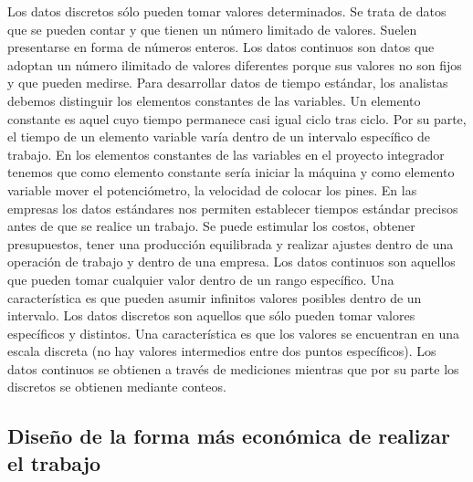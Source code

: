     Los datos discretos sólo pueden tomar valores determinados. Se trata de datos que se pueden contar y que tienen un número limitado de valores. Suelen presentarse en forma de números enteros. Los datos continuos son datos que adoptan un número ilimitado de valores diferentes porque sus valores no son fijos y que pueden medirse. 
    Para desarrollar datos de tiempo estándar, los analistas debemos distinguir los elementos constantes de las variables. Un elemento constante es aquel cuyo tiempo permanece casi igual ciclo tras ciclo. Por su parte, el tiempo de un elemento variable varía dentro de un intervalo específico de trabajo.
    En los elementos constantes de las variables en el proyecto integrador tenemos que como elemento constante sería iniciar la máquina y como elemento variable mover el potenciómetro, la velocidad de colocar los pines.
    En las empresas los datos estándares nos permiten establecer tiempos estándar precisos antes de que se realice un trabajo. Se puede estimular los costos, obtener presupuestos, tener una producción equilibrada y realizar ajustes dentro de una operación de trabajo y dentro de una empresa.
    Los datos continuos son aquellos que pueden tomar cualquier valor dentro de un rango específico. Una característica es que pueden asumir infinitos valores posibles dentro de un intervalo.
    Los datos discretos son aquellos que sólo pueden tomar valores específicos y distintos. Una característica es que los valores se encuentran en una escala discreta (no hay valores intermedios entre dos puntos específicos).
    Los datos continuos se obtienen a través de mediciones mientras que por su parte los discretos se obtienen mediante conteos.\cite{Datosestándarcontinuosydiscretos}
    \subsection{Diseño de la forma más económica de realizar el trabajo}
    
